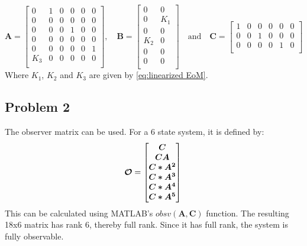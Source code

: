 \begin{equation}
  \label{eq:state_space_A_B_C}
  \bm{A} =
  \begin{bmatrix}
    0 & 1 & 0 & 0 & 0 & 0 \\
    0 & 0 & 0 & 0 & 0 & 0 \\
    0 & 0 & 0 & 1 & 0 & 0 \\
    0 & 0 & 0 & 0 & 0 & 0 \\
    0 & 0 & 0 & 0 & 0 & 1 \\
    K_3 & 0 & 0 & 0 & 0 & 0 \\
  \end{bmatrix}
  , \quad \bm{B} =
  \begin{bmatrix}
    0 & 0 \\
    0 & K_1 \\
    0 & 0 \\
    K_2 & 0 \\
    0 & 0 \\
    0 & 0 \\
  \end{bmatrix}
  \quad \text{and} \quad \bm{C} =
  \begin{bmatrix}
    1 & 0 & 0 & 0 & 0 & 0 \\
    0 & 0 & 1 & 0 & 0 & 0 \\
    0 & 0 & 0 & 0 & 1 & 0 \\
  \end{bmatrix}
\end{equation}
%
Where $K_1$, $K_2$ and $K_3$ are given by \cref{eq:linearized EoM}.
%
\subsection{Problem 2}
The observer matrix can be used. For a 6 state system, it is defined by:
\begin{equation}
  \bm{\mathcal{O}} =
  \begin{bmatrix}
    \bm{C} \\
    \bm{CA} \\
    \bm{C*A^2} \\
    \bm{C*A^3} \\
    \bm{C*A^4} \\
    \bm{C*A^5} \\
  \end{bmatrix} \\
\end{equation}
This can be calculated using MATLAB's $obsv(\bm{A},\bm{C})$
function. The resulting 18x6 matrix has rank 6, thereby full rank.
%
Since it has full rank, the system is fully observable.

